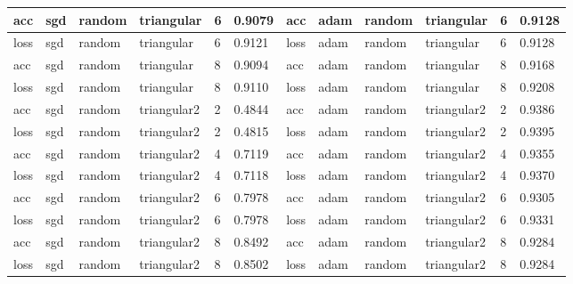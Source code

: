 \begin{table}[H]
\begin{adjustbox}{width=1\textwidth}
\begin{tabular}{|l|l|l|l|l|l||l|l|l|l|l|l|}
acc           & sgd          & random        & triangular      & 6             & 0.9079            & acc           & adam         & random        & triangular      & 6             & 0.9128            \\ \hline
loss          & sgd          & random        & triangular      & 6             & 0.9121            & loss          & adam         & random        & triangular      & 6             & 0.9128            \\ \hline
acc           & sgd          & random        & triangular      & 8             & 0.9094            & acc           & adam         & random        & triangular      & 8             & 0.9168            \\ \hline
loss          & sgd          & random        & triangular      & 8             & 0.9110            & loss          & adam         & random        & triangular      & 8             & 0.9208            \\ \hline
acc           & sgd          & random        & triangular2     & 2             & 0.4844            & acc           & adam         & random        & triangular2     & 2             & 0.9386            \\ \hline
loss          & sgd          & random        & triangular2     & 2             & 0.4815            & loss          & adam         & random        & triangular2     & 2             & 0.9395            \\ \hline
acc           & sgd          & random        & triangular2     & 4             & 0.7119            & acc           & adam         & random        & triangular2     & 4             & 0.9355            \\ \hline
loss          & sgd          & random        & triangular2     & 4             & 0.7118            & loss          & adam         & random        & triangular2     & 4             & 0.9370            \\ \hline
acc           & sgd          & random        & triangular2     & 6             & 0.7978            & acc           & adam         & random        & triangular2     & 6             & 0.9305            \\ \hline
loss          & sgd          & random        & triangular2     & 6             & 0.7978            & loss          & adam         & random        & triangular2     & 6             & 0.9331            \\ \hline
acc           & sgd          & random        & triangular2     & 8             & 0.8492            & acc           & adam         & random        & triangular2     & 8             & 0.9284            \\ \hline
loss          & sgd          & random        & triangular2     & 8             & 0.8502            & loss          & adam         & random        & triangular2     & 8             & 0.9284            \\ \hline
\end{tabular}
\end{adjustbox}
\label{t_res_efficientnet}
\end{table}

